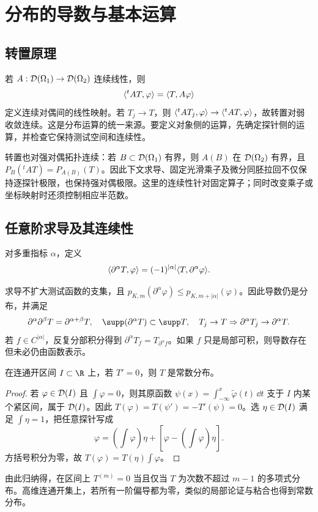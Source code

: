 \chapter{分布的导数与基本运算}\label{ch:operations}

\section{转置原理}
若 $A:\mathcal{D}(\Omega_1)\to\mathcal{D}(\Omega_2)$ 连续线性，则
\[
 \langle {}^tA T,\varphi\rangle=\langle T,A\varphi\rangle
\]
定义连续对偶间的线性映射。若 $T_j\to T$，则 $\langle {}^tAT_j,\varphi\rangle\to\langle {}^tAT,\varphi\rangle$，故转置对弱收敛连续。这是分布运算的统一来源。要定义对象侧的运算，先确定探针侧的运算，并检查它保持测试空间和连续性。

转置也对强对偶拓扑连续：若 $B\subset\mathcal{D}(\Omega_1)$ 有界，则 $A(B)$ 在 $\mathcal{D}(\Omega_2)$ 有界，且 $P_B({}^tAT)=P_{A(B)}(T)$。因此下文求导、固定光滑乘子及微分同胚拉回不仅保持逐探针极限，也保持强对偶极限。这里的连续性针对固定算子；同时改变乘子或坐标映射时还须控制相应半范数。

\section{任意阶求导及其连续性}
\begin{definition}[分布导数]
对多重指标 $\alpha$，定义
\begin{equation}\label{eq:distribution-derivative}
 \langle \partial^\alpha T,\varphi\rangle=(-1)^{|\alpha|}\langle T,\partial^\alpha\varphi\rangle.
\end{equation}
\end{definition}
求导不扩大测试函数的支集，且 $p_{K,m}(\partial^\alpha\varphi)\le p_{K,m+|\alpha|}(\varphi)$。因此导数仍是分布，并满足
\[
 \partial^\alpha\partial^\beta T=\partial^{\alpha+\beta}T,
 \quad\supp(\partial^\alpha T)\subset\supp T,
 \quad T_j\to T\Rightarrow\partial^\alpha T_j\to\partial^\alpha T.
\]
若 $f\in C^{|\alpha|}$，反复分部积分得到 $\partial^\alpha T_f=T_{\partial^\alpha f}$。如果 $f$ 只是局部可积，则导数存在但未必仍由函数表示。

\begin{proposition}[导数为零的分布]\label{prop:zero-derivative}
在连通开区间 $I\subset\R$ 上，若 $T'=0$，则 $T$ 是常数分布。
\end{proposition}
\begin{proof}
若 $\varphi\in\mathcal{D}(I)$ 且 $\int\varphi=0$，则其原函数 $\psi(x)=\int_{-\infty}^x\widetilde\varphi(t)\,\dd t$ 支于 $I$ 内某个紧区间，属于 $\mathcal{D}(I)$。因此 $T(\varphi)=T(\psi')=-T'(\psi)=0$。选 $\eta\in\mathcal{D}(I)$ 满足 $\int\eta=1$，把任意探针写成
\[
 \varphi=\left(\int\varphi\right)\eta+
 \left[\varphi-\left(\int\varphi\right)\eta\right].
\]
方括号积分为零，故 $T(\varphi)=T(\eta)\int\varphi$。
\end{proof}
由此归纳得，在区间上 $T^{(m)}=0$ 当且仅当 $T$ 为次数不超过 $m-1$ 的多项式分布。高维连通开集上，若所有一阶偏导都为零，类似的局部论证与粘合也得到常数分布。

